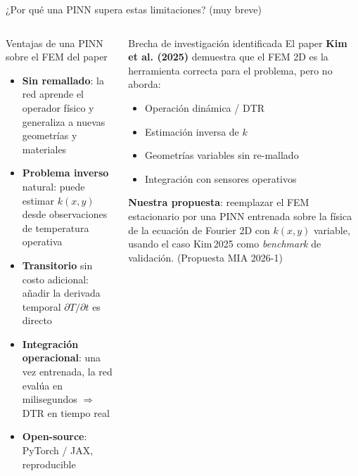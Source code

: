 \documentclass[aspectratio=169]{beamer}
\newcommand{\refcite}[1]{{\footnotesize\color{gray!70!black} #1}}
\begin{document}
\begin{frame}{¿Por qué una PINN supera estas limitaciones? (muy breve)}
\begin{columns}[T]
\begin{exampleblock}{Ventajas de una PINN sobre el FEM del paper}
\small
\begin{itemize}[leftmargin=*, itemsep=4pt]
  \item \textbf{Sin remallado}: la red aprende el operador físico y
        generaliza a nuevas geometrías y materiales
  \item \textbf{Problema inverso} natural: puede estimar $k(x,y)$ desde
        observaciones de temperatura operativa
  \item \textbf{Transitorio} sin costo adicional: añadir la derivada
        temporal $\partial T/\partial t$ es directo
  \item \textbf{Integración operacional}: una vez entrenada, la red
        evalúa en milisegundos $\Rightarrow$ DTR en tiempo real
  \item \textbf{Open-source}: PyTorch / JAX, reproducible
\end{itemize}
\end{exampleblock}

\begin{block}{\small Brecha de investigación identificada}
\small\justifying
El paper \textbf{Kim et al. (2025)} demuestra que el FEM 2D es la
herramienta correcta para el problema, pero no aborda:

\vspace{0.3em}
\begin{itemize}[leftmargin=*, itemsep=2pt]\scriptsize
  \item Operación dinámica / DTR
  \item Estimación inversa de $k$
  \item Geometrías variables sin re-mallado
  \item Integración con sensores operativos
\end{itemize}

\vspace{0.3em}
\textbf{Nuestra propuesta}: reemplazar el FEM estacionario por una PINN
entrenada sobre la física de la ecuación de Fourier 2D con $k(x,y)$
variable, usando el caso Kim\,2025 como \textit{benchmark} de validación.
\refcite{(Propuesta MIA 2026-1)}
\end{block}
\end{columns}
\end{frame}
\end{document}
